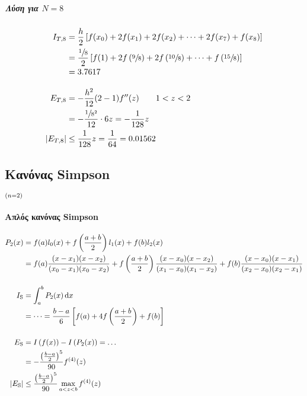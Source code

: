 \documentclass[11pt,a4paper,notitlepage,fleqn]{article}
\begin{document}
    \subparagraph{Λύση για \( N=8 \)}
    \begin{align*}
        I_{T,8} &= \frac{h}{2} \left[
        f(x_0)+2f(x_1)+2f(x_2)+\dots+2f(x_7)+f(x_8)
        \right] \\ &= \frac{\sfrac{1}{8} }{2}\left[
        f(1)+2f\left(\sfrac{9}{8}\right)+2f\left(\sfrac{10}{8}\right)
        +\dots+f\left(\sfrac{15}{8}\right)
        \right]
        \\ &= 3.7617 \\[3ex]
    	E_{T,8} &= -\frac{h^2}{12}(2-1)f''(z) \qquad 1<z<2 \\
    	&= -\frac{\sfrac{1}{8^2} }{12}\cdot 6z=-\frac{1}{128}z \\
    	|E_{T,8}| &\leq \frac{1}{128}z=\frac{1}{64}=0.01562
    \end{align*}
    
    \subsection{Κανόνας Simpson}
    \( \mathsmaller{(n = 2)} \)
    
    
    
    \paragraph{Απλός κανόνας Simpson}
    \begin{align*}
    	P_2(x) &= f(a)l_0(x) +f\left(\frac{a+b}{2}\right)l_1(x)+f(b)
    	l_2(x) \\ &= f(a) \frac{(x-x_1)(x-x_2)}{(x_0-x_1)(x_0-x_2)}
    	+ f\left(\frac{a+b}{2}\right)
    	\frac{(x-x_0)(x-x_2)}{(x_1-x_0)(x_1-x_2)}
    	+ f(b) \frac{(x-x_0)(x-x_1)}{(x_2-x_0)(x_2-x_1)}
    	\\[3ex]
    	I_{\mathrm S} &= \int_a^b P_2(x)\mathop{}\!\mathrm{d} x
    	\\ &= \dots = \frac{b-a}{6} \left[
    	f(a)+4f\left(\frac{a+b}{2}\right)+f(b) \right] \\[3ex]
    	E_{\mathrm S} &= I\left(f(x)\right)-I\left(P_2(x)\right) = \dots
    	\\ &= -\frac{\left(\frac{b-a}{2}\right)^5}{90} f^{(4)}(z) \\
    	\left|E_{\mathrm S}\right| &\leq
    	\frac{\left(\frac{b-a}{2}\right)^5}{90}\max_{a<z<b}f^{(4)}(z)
    \end{align*}
    
\end{document}
